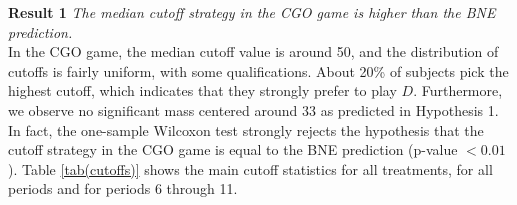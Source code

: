 \documentclass[12pt, letterpaper]{article}
\theoremstyle{plain}
\begin{document}
\noindent \textbf{Result 1}
\textit{The median cutoff strategy in the CGO game is higher than the BNE prediction.}\\

 In the CGO game, the median cutoff value is around 50, and the distribution of cutoffs is fairly uniform, with some qualifications. About 20\% of subjects pick the highest cutoff, which indicates that they strongly prefer to play $D$. Furthermore, we observe no significant mass centered around 33 as predicted in Hypothesis 1. In fact, the one-sample Wilcoxon test strongly rejects the hypothesis that the cutoff strategy in the CGO game is equal to the BNE prediction (p-value $< 0.01$). Table \ref{tab(cutoffs)} shows the main cutoff statistics for all treatments, for all periods and for periods 6 through 11. \\
 
\end{document}
